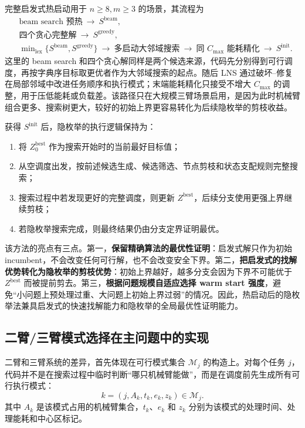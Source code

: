完整启发式热启动用于 $n\ge 8,m\ge 3$ 的场景，其流程为
\[
\begin{aligned}
    &\text{beam search 预热}
    \ \longrightarrow\
    S^{\mathrm{beam}},\\
    &\text{四个贪心完整解}
    \ \longrightarrow\
    S^{\mathrm{greedy}},\\
    &\min\nolimits_{\mathrm{lex}}\{S^{\mathrm{beam}},S^{\mathrm{greedy}}\}
    \ \longrightarrow\
    \text{多启动大邻域搜索}
    \ \longrightarrow\
    \text{同 }C_{\max}\text{ 能耗精化}
    \ \longrightarrow\
    S^{\mathrm{init}} .
\end{aligned}
\]
这里的 beam search 和四个贪心解同样是两个候选来源，代码先分别得到可行调度，再按字典序目标取更优者作为大邻域搜索的起点。随后 LNS 通过破坏--修复在局部邻域中改进任务顺序和执行模式；末端能耗精化只接受不增大 $C_{\max}$ 的调整，用于压低能耗或负载差。该路径只在大规模三臂场景启用，是因为此时机械臂组合更多、搜索树更大，较好的初始上界更容易转化为后续隐枚举的剪枝收益。

获得 $S^{\mathrm{init}}$ 后，隐枚举的执行逻辑保持为：
\begin{enumerate}
    \item 将 $Z^{\mathrm{best}}_0$ 作为搜索开始时的当前最好目标值；
    \item 从空调度出发，按前述候选生成、候选筛选、节点剪枝和状态支配规则完整搜索；
    \item 搜索过程中若发现更好的完整调度，则更新 $Z^{\mathrm{best}}$，后续分支使用更强上界继续剪枝；
    \item 若隐枚举搜索完成，则最终结果仍由分支定界证明最优。
\end{enumerate}

该方法的亮点有三点。第一，\textbf{保留精确算法的最优性证明}：启发式解只作为初始 incumbent，不会改变任何可行解，也不会改变安全下界。第二，\textbf{把启发式的找解优势转化为隐枚举的剪枝优势}：初始上界越好，越多分支会因为下界不可能优于 $Z^{\mathrm{best}}$ 而被提前剪去。第三，\textbf{根据问题规模自适应选择 warm start 强度}，避免“小问题上预处理过重、大问题上初始上界过弱”的情况。因此，热启动后的隐枚举法兼具启发式的快速找解能力和隐枚举的全局最优性证明能力。

\subsection{二臂/三臂模式选择在主问题中的实现}

二臂和三臂系统的差异，首先体现在可行模式集合 $\mathcal{M}_j$ 的构造上。对每个任务 $j$，代码并不是在搜索过程中临时判断“哪只机械臂能做”，而是在调度前先生成所有可行执行模式：
\[
    k=(j,A_k,t_k,e_k,z_k)\in\mathcal{M}_j .
\]
其中 $A_k$ 是该模式占用的机械臂集合，$t_k$、$e_k$ 和 $z_k$ 分别为该模式的处理时间、处理能耗和中心区标记。

